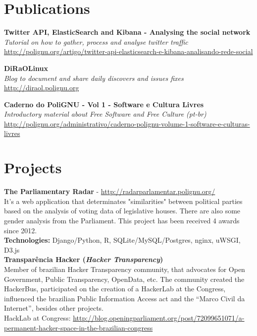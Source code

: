 \documentclass[]{friggeri-cv}
\begin{document}
\section{Publications}
\textbf{Twitter API, ElasticSearch and Kibana - Analysing the social network}\\
\emph{Tutorial on how to gather, process and analyse twitter traffic}\\
\href{http://polignu.org/artigo/twitter-api-elasticsearch-e-kibana-analisando-rede-social}{http://polignu.org/artigo/twitter-api-elasticsearch-e-kibana-analisando-rede-social}

\textbf{DiRaOLinux}\\
\emph{Blog to document and share daily discovers and issues fixes}\\
\href{http://diraol.polignu.org}{http://diraol.polignu.org}

\textbf{Caderno do PoliGNU - Vol 1 - Software e Cultura Livres}\\
\emph{Introductory material about Free Software and Free Culture (pt-br)}\\
\href{http://polignu.org/administrativo/caderno-polignu-volume-1-software-e-culturas-livres}{http://polignu.org/administrativo/caderno-polignu-volume-1-software-e-culturas-livres}

\section{Projects}
\textbf{The Parliamentary Radar} - \href{http://radarparlamentar.polignu.org/}{http://radarparlamentar.polignu.org/}\\
It's a web application that determinates "similarities" between political parties based on the analysis of voting data of legislative houses. There are also some gender analysis from the Parliament. 
This project has been received 4 awards since 2012.\\
\textbf{Technologies:} Django/Python, R, SQLite/MySQL/Postgres, nginx, uWSGI, D3.js\\

\textbf{Transparência Hacker (\textit{Hacker Transparency})}\\
Member of brazilian Hacker Transparency community, that advocates for Open Government, Public Transparency, OpenData, etc. The community created the HackerBus, participated on the creation of a HackerLab at the Congress, influenced the brazilian Public Information Access act and the ``Marco Civil da Internet'', besides other projects.\\
HackLab at Congress: \href{http://blog.openingparliament.org/post/72099651071/a-permanent-hacker-space-in-the-brazilian-congress}{http://blog.openingparliament.org/post/72099651071/a-permanent-hacker-space-in-the-brazilian-congress}
\end{document}
